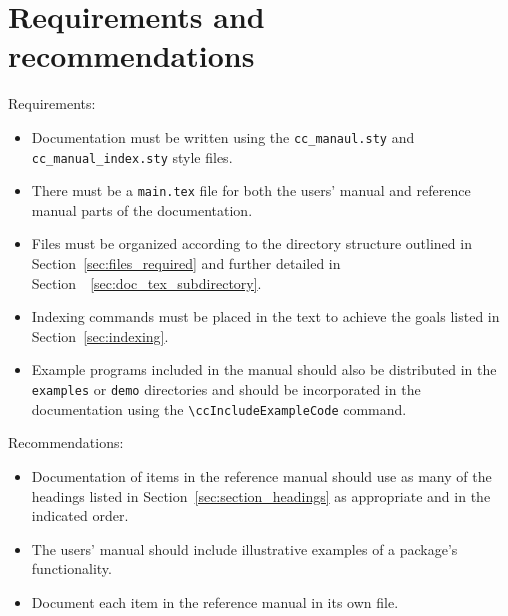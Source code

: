 \section{Requirements and recommendations}
\label{sec:specification_req_and_rec}

\noindent
Requirements:
\begin{itemize}
   \item Documentation must be written using the {\tt cc\_manaul.sty}
         and {\tt cc\_manual\_index.sty} style files.
   \item There must be a {\tt main.tex} file for both the users' manual
         and reference manual parts of the documentation.
   \item Files must be organized according to the directory structure
         outlined in Section~\ref{sec:files_required} and further detailed
         in Section~~\ref{sec:doc_tex_subdirectory}.
   \item Indexing commands must be placed in the text to achieve the
         goals listed in Section~\ref{sec:indexing}.
   \item Example programs included in the manual should also be distributed
         in the \texttt{examples} or \texttt{demo} directories and should
         be incorporated in the documentation  using the 
         \verb|\ccIncludeExampleCode| command.
\end{itemize}

\noindent
Recommendations:
\begin{itemize}
   \item Documentation of items in the reference manual should use as
         many of the headings listed in Section~\ref{sec:section_headings}
         as appropriate and in the indicated order.
   \item The users' manual should include illustrative examples of a package's
         functionality.
   \item Document each item in the reference manual in its own file.
\end{itemize}

